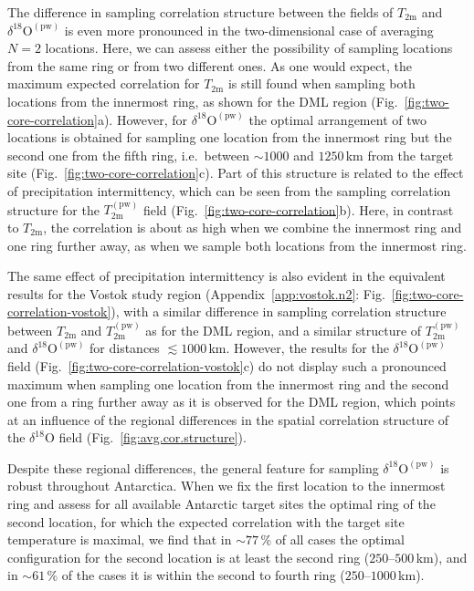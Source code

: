 \documentclass[cp, manuscript, draft]{copernicus}
\begin{document}
The difference in sampling correlation structure between the fields of
$T_{\mathrm{2m}}$ and $\delta^{18}\mathrm{O}^{\mathrm{(pw)}}$ is even more
pronounced in the two-dimensional case of averaging $N=2$ locations. Here, we
can assess either the possibility of sampling locations from the same ring or
from two different ones. As one would expect, the maximum expected correlation
for $T_{\mathrm{2m}}$ is still found when sampling both locations from the
innermost ring, as shown for the DML region
(Fig.~\ref{fig:two-core-correlation}a). However, for
$\delta^{18}\mathrm{O}^{\mathrm{(pw)}}$ the optimal arrangement of two locations
is obtained for sampling one location from the innermost ring but the second
one from the fifth ring, i.e.\ between $\sim1000$ and $1250$\,km from the target
site (Fig.~\ref{fig:two-core-correlation}c). Part of this structure is related
to the effect of precipitation intermittency, which can be seen from the
sampling correlation structure for the $T_{\mathrm{2m}}^{\mathrm{(pw)}}$ field
(Fig.~\ref{fig:two-core-correlation}b). Here, in contrast to $T_{\mathrm{2m}}$,
the correlation is about as high when we combine the innermost ring and one ring
further away, as when we sample both locations from the innermost ring.

The same effect of precipitation intermittency is also evident in the equivalent
results for the Vostok study region (Appendix~\ref{app:vostok.n2}:
Fig.~\ref{fig:two-core-correlation-vostok}), with a similar difference in
sampling correlation structure between $T_{\mathrm{2m}}$ and
$T_{\mathrm{2m}}^{\mathrm{(pw)}}$ as for the DML region, and a similar structure
of $T_{\mathrm{2m}}^{\mathrm{(pw)}}$ and
$\delta^{18}\mathrm{O}^{\mathrm{(pw)}}$ for distances $\lesssim1000$\,km.
However, the results for the $\delta^{18}\mathrm{O}^{\mathrm{(pw)}}$ field
(Fig.~\ref{fig:two-core-correlation-vostok}c) do not display such a pronounced
maximum when sampling one location from the innermost ring and the second one
from a ring further away as it is observed for the DML region, which points at
an influence of the regional differences in the spatial correlation structure of
the $\delta^{18}\mathrm{O}$ field (Fig.~\ref{fig:avg.cor.structure}).

Despite these regional differences, the general feature for sampling
$\delta^{18}\mathrm{O}^{\mathrm{(pw)}}$ is robust throughout Antarctica. When we
fix the first location to the innermost ring and assess for all available
Antarctic target sites the optimal ring of the second location, for which the
expected correlation with the target site temperature is maximal, we find that
in $\sim77\,\%$ of all cases the optimal configuration for the second location
is at least the second ring ($250$--$500$\,km), and in $\sim61\,\%$ of the cases
it is within the second to fourth ring ($250$--$1000$\,km).
\end{document}
